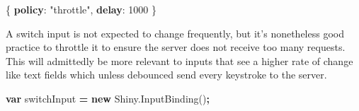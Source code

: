 \documentclass[
]{krantz}
\makeatletter
\newenvironment{Shaded}{\begin{snugshade}}{\end{snugshade}}
\newcommand{\AttributeTok}[1]{\textcolor[rgb]{0.61,0.61,0.61}{#1}}
\newcommand{\DecValTok}[1]{\textcolor[rgb]{0.06,0.06,0.06}{#1}}
\newcommand{\ErrorTok}[1]{\textcolor[rgb]{0.14,0.14,0.14}{\textbf{#1}}}
\newcommand{\FunctionTok}[1]{\textcolor[rgb]{0,0,0}{#1}}
\newcommand{\KeywordTok}[1]{\textcolor[rgb]{0.27,0.27,0.27}{\textbf{#1}}}
\newcommand{\NormalTok}[1]{#1}
\newcommand{\OperatorTok}[1]{\textcolor[rgb]{0.43,0.43,0.43}{\textbf{#1}}}
\newcommand{\StringTok}[1]{\textcolor[rgb]{0.5,0.5,0.5}{#1}}
\newcommand{\VariableTok}[1]{\textcolor[rgb]{0,0,0}{#1}}
\newenvironment{kframe}{%
\medskip{}
\setlength{\fboxsep}{.8em}
 \def\at@end@of@kframe{}%
 \ifinner\ifhmode%
  \def\at@end@of@kframe{\end{minipage}}%
  \begin{minipage}{\columnwidth}%
 \fi\fi%
 \def\FrameCommand##1{\hskip\@totalleftmargin \hskip-\fboxsep
 \colorbox{shadecolor}{##1}\hskip-\fboxsep
     \hskip-\linewidth \hskip-\@totalleftmargin \hskip\columnwidth}%
 \MakeFramed {\advance\hsize-\width
   \@totalleftmargin\z@ \linewidth\hsize
   \@setminipage}}%
 {\par\unskip\endMakeFramed%
 \at@end@of@kframe}
\renewenvironment{Shaded}{\begin{kframe}}{\end{kframe}}
\makeatother
\begin{document}
\begin{Shaded}
\begin{Highlighting}[]
\FunctionTok{\{}
  \ErrorTok{policy}\FunctionTok{:} \StringTok{"throttle"}\FunctionTok{,}
  \ErrorTok{delay}\FunctionTok{:} \DecValTok{1000}
\FunctionTok{\}}
\end{Highlighting}
\end{Shaded}

A switch input is not expected to change frequently, but it's nonetheless good practice to throttle it to ensure the server does not receive too many requests. This will admittedly be more relevant to inputs that see a higher rate of change like text fields which unless debounced send every keystroke to the server.

\begin{Shaded}
\begin{Highlighting}[]
\KeywordTok{var}\NormalTok{ switchInput }\OperatorTok{=} \KeywordTok{new} \VariableTok{Shiny}\NormalTok{.}\AttributeTok{InputBinding}\NormalTok{()}\OperatorTok{;}


\end{Highlighting}
\end{Shaded}
\end{document}
